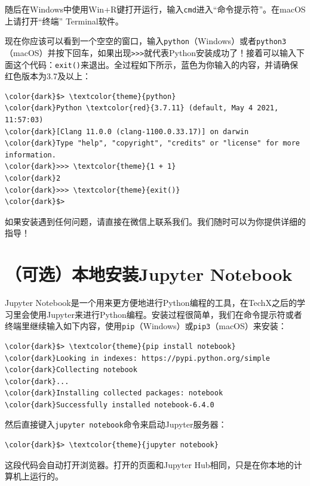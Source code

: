 \documentclass{article}
\begin{document}
随后在Windows中使用Win+R键打开运行，输入\texttt{cmd}进入“命令提示符”。在macOS上请打开“终端” Terminal软件。

现在你应该可以看到一个空空的窗口，输入\texttt{python}（Windows）或者\texttt{python3}（macOS）并按下回车，如果出现\texttt{>>>}就代表Python安装成功了！接着可以输入下面这个代码：\texttt{exit()}来退出。全过程如下所示，蓝色为你输入的内容，并请确保红色版本为3.7及以上：

\begin{Verbatim}[commandchars=\\\{\},xleftmargin=1.5cm]
\color{dark}$> \textcolor{theme}{python}
\color{dark}Python \textcolor{red}{3.7.11} (default, May 4 2021, 11:57:03)
\color{dark}[Clang 11.0.0 (clang-1100.0.33.17)] on darwin
\color{dark}Type "help", "copyright", "credits" or "license" for more information.
\color{dark}>>> \textcolor{theme}{1 + 1}
\color{dark}2
\color{dark}>>> \textcolor{theme}{exit()}
\color{dark}$>
\end{Verbatim}

如果安装遇到任何问题，请直接在微信上联系我们。我们随时可以为你提供详细的指导！

\section{（可选）本地安装Jupyter Notebook}
Jupyter Notebook是一个用来更方便地进行Python编程的工具，在TechX之后的学习里会使用Jupyter来进行Python编程。安装过程很简单，我们在命令提示符或者终端里继续输入如下内容，使用\texttt{pip}（Windows）或\texttt{pip3}（macOS）来安装：
\begin{Verbatim}[commandchars=\\\{\},xleftmargin=1.5cm]
\color{dark}$> \textcolor{theme}{pip install notebook}
\color{dark}Looking in indexes: https://pypi.python.org/simple
\color{dark}Collecting notebook
\color{dark}...
\color{dark}Installing collected packages: notebook
\color{dark}Successfully installed notebook-6.4.0
\end{Verbatim}

然后直接键入\texttt{jupyter notebook}命令来启动Jupyter服务器：
\begin{Verbatim}[commandchars=\\\{\},xleftmargin=1.5cm]
\color{dark}$> \textcolor{theme}{jupyter notebook}
\end{Verbatim}

这段代码会自动打开浏览器。打开的页面和Jupyter Hub相同，只是在你本地的计算机上运行的。
\end{document}
